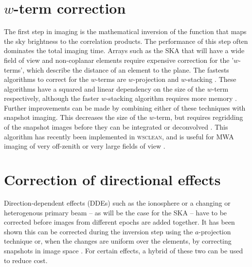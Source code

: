 \documentclass[9pt,conference,a4paper]{IEEEtran}
\begin{document}
\section{$w$-term correction}
The first step in imaging is the mathematical inversion of the function that maps the sky brightness to the correlation products. The performance of this step often dominates the total imaging time. Arrays such as the SKA that will have a wide field of view and non-coplanar elements require expensive correction for the '$w$-terms', which describe the distance of an element to the plane. The fastests algorithms to correct for the $w$-terms are $w$-projection \cite{wprojection-cornwell} and $w$-stacking \cite{ska-memo-regridding-2011}. These algorithms have a squared and linear dependency on the size of the $w$-term respectively, although the faster $w$-stacking algorithm requires more memory \cite{offringa-wsclean-2014}. Further improvements can be made by combining either of these techniques with snapshot imaging. This decreases the size of the $w$-term, but requires regridding of the snapshot images before they can be integrated or deconvolved \cite{widefield-imaging-ska-cornwell}. This algorithm has recently been implemented in \textsc{wsclean}, and is useful for MWA imaging of very off-zenith or very large fields of view \cite{offringa-wsclean-2014}.

\section{Correction of directional effects}
Direction-dependent effects (DDEs) such as the ionosphere or a changing or heterogenous primary beam -- as will be the case for the SKA -- have to be corrected before images from different epochs are added together. It has been shown this can be corrected during the inversion step using the $a$-projection technique \cite{aprojection-2008} or, when the changes are uniform over the elements, by correcting snapshots in image space \cite{offringa-wsclean-2014}. For certain effects, a hybrid of these two can be used to reduce cost.
\end{document}
